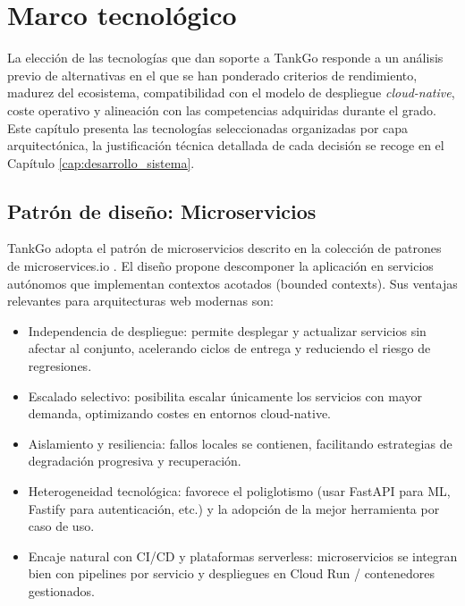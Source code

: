 
\chapter{Marco tecnológico}
\label{cap:marco_tecnologico}

La elección de las tecnologías que dan soporte a TankGo responde a un análisis previo
de alternativas en el que se han ponderado criterios de rendimiento, madurez del
ecosistema, compatibilidad con el modelo de despliegue \textit{cloud-native}, coste
operativo y alineación con las competencias adquiridas durante el grado. Este capítulo
presenta las tecnologías seleccionadas organizadas por capa arquitectónica, la
justificación técnica detallada de cada decisión se recoge en el Capítulo \ref{cap:desarrollo_sistema}.

\section{Patrón de diseño: Microservicios}

TankGo adopta el patrón de microservicios descrito en la colección de patrones de
microservices.io \cite{microservices_io}. El diseño propone descomponer la aplicación en
servicios autónomos que implementan contextos acotados (bounded contexts). Sus ventajas
relevantes para arquitecturas web modernas son:

\begin{itemize}
    \item Independencia de despliegue: permite desplegar y actualizar servicios sin afectar al
          conjunto, acelerando ciclos de entrega y reduciendo el riesgo de regresiones.
    \item Escalado selectivo: posibilita escalar únicamente los servicios con mayor demanda,
          optimizando costes en entornos cloud-native.
    \item Aislamiento y resiliencia: fallos locales se contienen, facilitando estrategias de
          degradación progresiva y recuperación.
    \item Heterogeneidad tecnológica: favorece el poliglotismo (usar FastAPI para ML, Fastify
          para autenticación, etc.) y la adopción de la mejor herramienta por caso de uso.
    \item Encaje natural con CI/CD y plataformas serverless: microservicios se integran bien con
          pipelines por servicio y despliegues en Cloud Run / contenedores gestionados.
\end{itemize}

